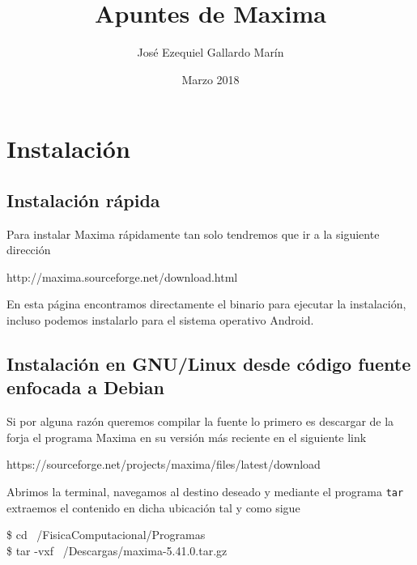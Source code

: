 \documentclass[a4paper, 12pt] {article}
\begin{document}
\title{Apuntes de Maxima}
\author{Jos\'e Ezequiel Gallardo Mar\'in}
\date{Marzo 2018}
\maketitle
\pagebreak

\section{Instalación}
\subsection{Instalación rápida}
Para instalar Maxima rápidamente tan solo tendremos que ir a la siguiente dirección
\begin{center}
http://maxima.sourceforge.net/download.html
\end{center}
En esta página encontramos directamente el binario para ejecutar la instalación, incluso podemos instalarlo para el sistema operativo Android.

\subsection{Instalación en GNU/Linux desde código fuente enfocada a Debian}
Si por alguna razón queremos compilar la fuente lo primero es descargar de la forja el programa Maxima en su versión más reciente en el siguiente link
\begin{center}
  https://sourceforge.net/projects/maxima/files/latest/download
\end{center}
Abrimos la terminal, navegamos al destino deseado y mediante el programa \texttt{tar} extraemos el contenido en dicha ubicación tal y como sigue
\begin{center}
\$ cd ~/FisicaComputacional/Programas \\
\$ tar -vxf ~/Descargas/maxima-5.41.0.tar.gz 
\end{center}
\end{document}

